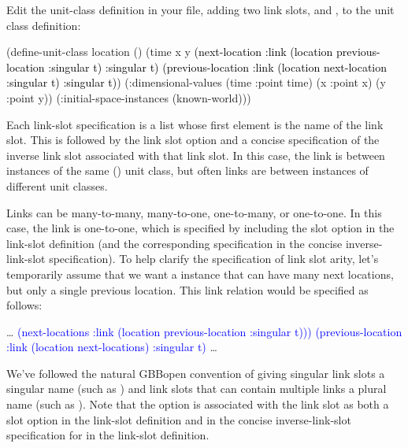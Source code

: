 \documentclass[10pt,twoside,english,pdftex]{article}
\begin{document}
Edit the  unit-class definition in your
 file, adding two link slots,
 and , to the
 unit class definition:
%
\W\supp
\begin{example}
\textcolor{darkergray}{%
  (define-unit-class location ()
    (time 
     x y
     \textcolor{black}{(next-location
      :link (location previous-location :singular t) 
      :singular t)
     (previous-location
      :link (location next-location :singular t)  
      :singular t)})
    (:dimensional-values
      (time :point time)
      (x :point x)
      (y :point y))
    (:initial-space-instances (known-world)))}
\end{example}

Each link-slot specification is a list whose first element is the name of the
link slot.  This is followed by the link slot option  and a
concise specification of the inverse link slot associated with that link slot.
In this case, the  link is
between instances of the same () unit class, but often
links are between instances of different unit classes.

Links can be many-to-many, many-to-one, one-to-many, or one-to-one.  In this
case, the  link is
one-to-one, which is specified by including the  slot
option in the link-slot definition (and the corresponding
 specification in the concise inverse-link-slot
specification).  To help clarify the specification of link slot arity, let's
temporarily assume that we want a  instance that can
have many next locations, but only a single previous location.  This link
relation would be specified as follows:
%
\W\supp
\begin{example}
\textcolor{darkergray}{%
     \textrm{\ldots{}}
   \textcolor{blue}{(next-locations
    :link (location previous-location :singular t)))
   (previous-location
    :link (location next-locations)  
    :singular t)}
     \textrm{\ldots{}}}
\end{example}

We've followed the natural GBBopen convention of giving singular link slots a
singular name (such as ) and link slots that
can contain multiple links a plural name (such as
).  Note that the  option is
associated with the  link slot as both a slot
option in the  link-slot definition and in the
concise inverse-link-slot specification for  in
the  link-slot definition.
\end{document}
